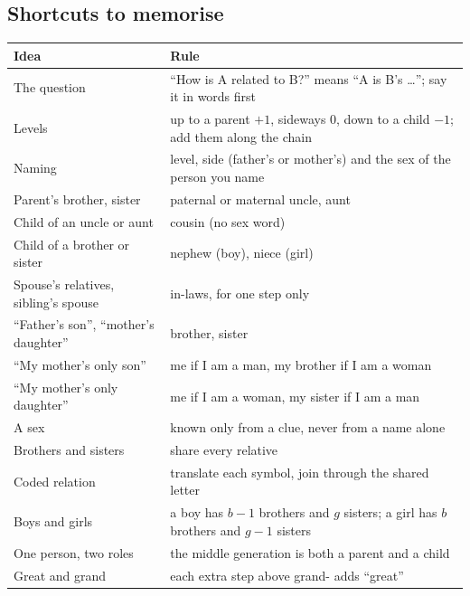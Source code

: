 \documentclass[11pt,a4paper]{article}
\let\oldsubsection\subsection
\renewcommand{\subsection}{\needspace{9\baselineskip}\oldsubsection}
\begin{document}
\subsection*{Shortcuts to memorise}
\begin{center}\small\renewcommand{\arraystretch}{1.9}\setlength{\tabcolsep}{8pt}
\begin{tabularx}{\linewidth}{@{}>{\raggedright\arraybackslash}X>{\raggedright\arraybackslash}X@{}}
\toprule
\textbf{\color{slate}Idea} & \textbf{\color{slate}Rule} \\ \midrule
The question & ``How is A related to B?'' means ``A is B's \dots''; say it in words first \\
Levels & up to a parent $+1$, sideways $0$, down to a child $-1$; add them along the chain \\
Naming & level, side (father's or mother's) and the sex of the person you name \\
Parent's brother, sister & paternal or maternal uncle, aunt \\
Child of an uncle or aunt & cousin (no sex word) \\
Child of a brother or sister & nephew (boy), niece (girl) \\
Spouse's relatives, sibling's spouse & in-laws, for one step only \\
``Father's son'', ``mother's daughter'' & brother, sister \\
``My mother's only son'' & me if I am a man, my brother if I am a woman \\
``My mother's only daughter'' & me if I am a woman, my sister if I am a man \\
A sex & known only from a clue, never from a name alone \\
Brothers and sisters & share every relative \\
Coded relation & translate each symbol, join through the shared letter \\
Boys and girls & a boy has $b-1$ brothers and $g$ sisters; a girl has $b$ brothers and $g-1$ sisters \\
One person, two roles & the middle generation is both a parent and a child \\
Great and grand & each extra step above grand- adds ``great'' \\
\bottomrule
\end{tabularx}\end{center}
\end{document}
